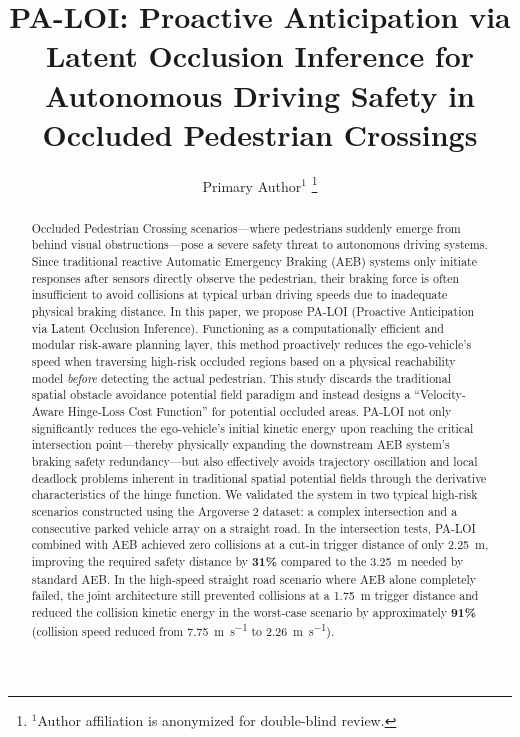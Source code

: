 \documentclass[letterpaper, 10 pt, conference]{ieeeconf}  %
\title{\LARGE \bf
PA-LOI: Proactive Anticipation via Latent Occlusion Inference for Autonomous Driving Safety in Occluded Pedestrian Crossings
}
\author{Primary Author$^{1}$%
\thanks{$^{1}$Author affiliation is anonymized for double-blind review.}%
}
\begin{document}
\maketitle
\thispagestyle{empty}
\pagestyle{empty}


\begin{abstract}
Occluded Pedestrian Crossing scenarios---where pedestrians suddenly emerge from behind visual obstructions---pose a severe safety threat to autonomous driving systems. Since traditional reactive Automatic Emergency Braking (AEB) systems only initiate responses after sensors directly observe the pedestrian, their braking force is often insufficient to avoid collisions at typical urban driving speeds due to inadequate physical braking distance. In this paper, we propose PA-LOI (Proactive Anticipation via Latent Occlusion Inference). Functioning as a computationally efficient and modular risk-aware planning layer, this method proactively reduces the ego-vehicle's speed when traversing high-risk occluded regions based on a physical reachability model \emph{before} detecting the actual pedestrian. This study discards the traditional spatial obstacle avoidance potential field paradigm and instead designs a ``Velocity-Aware Hinge-Loss Cost Function'' for potential occluded areas. PA-LOI not only significantly reduces the ego-vehicle's initial kinetic energy upon reaching the critical intersection point---thereby physically expanding the downstream AEB system's braking safety redundancy---but also effectively avoids trajectory oscillation and local deadlock problems inherent in traditional spatial potential fields through the derivative characteristics of the hinge function. We validated the system in two typical high-risk scenarios constructed using the Argoverse 2 dataset: a complex intersection and a consecutive parked vehicle array on a straight road. In the intersection tests, PA-LOI combined with AEB achieved zero collisions at a cut-in trigger distance of only \SI{2.25}{\meter}, improving the required safety distance by \textbf{31\%} compared to the \SI{3.25}{\meter} needed by standard AEB. In the high-speed straight road scenario where AEB alone completely failed, the joint architecture still prevented collisions at a \SI{1.75}{\meter} trigger distance and reduced the collision kinetic energy in the worst-case scenario by approximately \textbf{91\%} (collision speed reduced from \SI{7.75}{\meter\per\second} to \SI{2.26}{\meter\per\second}).
\end{abstract}
\end{document}
